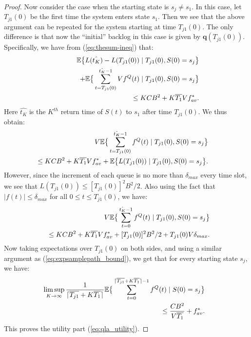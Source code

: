 \documentclass[journal]{IEEEtran}
\newcommand{\expect}[1]{\mathbb{E}\big\{#1\big\}}
\newcommand{\bv}[1]{{\boldsymbol{#1} }}
\begin{document}
\begin{proof}
Now consider the case when the starting state is $s_j\neq s_1$. In this case, let $T_{j1}(0)$ be the first time the system enters state $s_1$. Then we see that the above argument can be repeated for the system starting at time $T_{j1}(0)$. The only difference 
is that now the ``initial'' backlog in this case is given by $\bv{q}(T_{j1}(0))$. Specifically, we have from (\ref{eq:thesum-ineq}) that:
\begin{eqnarray}
\hspace{-.3in}&&\expect{L(\hat{t_{K}})-L(T_{j1}(0))\left.|\right. T_{j1}(0), S(0)=s_j} \\
\hspace{-.3in}&& \qquad\qquad\quad+ \expect{\sum_{t=T_{j1}(0)}^{\hat{t_{K}}-1}Vf^Q(t)\left.|\right. T_{j1}(0), S(0)=s_j}\nonumber\\
\hspace{-.3in}&& \qquad\qquad\quad \leq KCB^2 + K\overline{T_{1}} Vf^*_{av}.\nonumber
\end{eqnarray}
Here $\hat{t_K}$ is the $K^{th}$ return time of $S(t)$ to $s_1$ after time $T_{j1}(0)$. We  thus obtain:
\begin{eqnarray*}
\hspace{-.3in}&&V\expect{\sum_{t=T_{j1}(0)}^{\hat{t_K}-1}f^Q(t)\left.|\right. T_{j1}(0), S(0)=s_j}\\
\hspace{-.3in}&&  \leq KCB^2 +  K\overline{T_1}Vf^*_{av} + \expect{L(T_{j1}(0))\left.|\right. T_{j1}(0), S(0)=s_j}.
\end{eqnarray*}
However, since the increment of each queue is no more than $\delta_{max}$ every time slot, we see that $L(T_{j1}(0))\leq [T_{j1}(0)]^2B^2/2$. Also using the fact that $|f(t)|\leq\delta_{max}$ for all $0\leq t\leq T_{j1}(0)$, we have:
\begin{eqnarray*}
\hspace{-.3in}&&V\expect{\sum_{t=0}^{\hat{t_K}-1}f^Q(t)\left.|\right. T_{j1}(0), S(0)=s_j}\\
\hspace{-.3in}&& \qquad  \leq KCB^2 +  K\overline{T_1}Vf^*_{av} + [T_{j1}(0)]^2B^2/2 + T_{j1}(0)V\delta_{max}.
\end{eqnarray*}
Now taking expectations over $T_{j1}(0)$ on both sides,  and using a similar argument as (\ref{eq:expsamplepath_bound}), we get that for every starting state $s_j$, we have:
\begin{eqnarray*}
\hspace{-.3in}&&\limsup_{K\rightarrow\infty}\frac{1}{\lceil\overline{T_{j1}}+K\overline{T_1}\rceil}\expect{\sum_{t=0}^{\lceil\overline{T_{j1}}+K\overline{T_1}\rceil-1}f^Q(t)\left.|\right. S(0)=s_j}\\
\hspace{-.3in}&&\qquad\qquad\qquad\qquad\qquad\qquad\qquad\qquad\qquad\leq \frac{CB^2}{V\overline{T_1}} +  f^*_{av}. %
\end{eqnarray*}
This proves the utility part (\ref{eq:qla_utility}). 


\end{proof}
\end{document}
